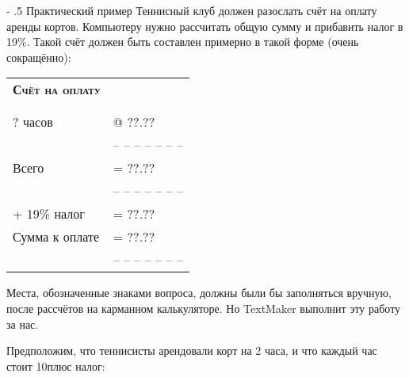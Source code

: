 ﻿\documentclass[a4paper,10pt]{article}
\makeatletter
\renewcommand\paragraph{%
   \@startsection{paragraph}{4}{0mm}%
      {-\baselineskip}%
      {.5\baselineskip}%
      {\normalfont\normalsize\bfseries}}
\makeatother
\begin{document}
\paragraph{Практический пример}
Теннисный клуб должен разослать счёт на оплату аренды кортов. Компьютеру нужно рассчитать общую сумму и прибавить налог в 19\%. Такой счёт должен быть составлен примерно в такой форме (очень сокращённо):

\begin{center}
\begin{tabular}{ | m{5cm}  m{8cm} | }
 \hline
 \textbf{\textsc{Счёт на оплату}} & \\ 
 & \\
 & \\
  ? часов & @ ??.??\\
  & -- -- -- -- -- -- --\\
  Всего & = ??.??\\
  & -- -- -- -- -- -- --\\
+ 19\% налог & = ??.??\\
Сумма к оплате & = ??.??\\
  & -- -- -- -- -- -- --\\
  \hline
\end{tabular}
\end{center}

Места, обозначенные знаками вопроса, должны были бы заполняться вручную, после рассчётов на карманном калькуляторе. Но TextMaker выполнит эту работу за нас.

Предположим, что теннисисты арендовали корт на 2 часа, и что каждый час стоит 10\textdollar плюс налог:
\end{document}
